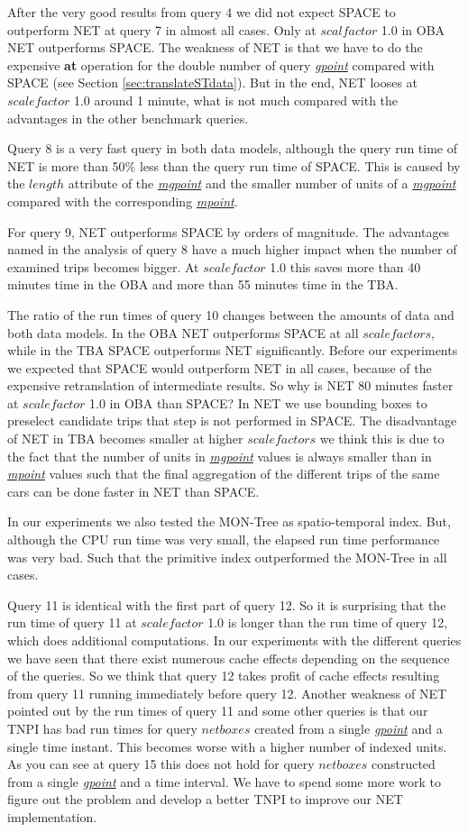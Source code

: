 \documentclass[a4paper]{article}
\newcommand{\op}[1]{\textbf{#1}}
\newcommand{\dt}[1]{\textsl{\underline{#1}}}
\begin{document}
After the very good results from query 4 we did not expect SPACE to outperform
NET at query 7 in almost all cases. Only at $scalfactor$ 1.0 in OBA NET outperforms
SPACE. The weakness of NET is that we have to do the expensive \op{at} operation
for the double number of query \dt{gpoint} compared with SPACE
(see Section \ref{sec:translateSTdata}).
But in the end, NET looses at $scalefactor$ 1.0 around 1 minute, what is not much
compared with the advantages in the other benchmark queries.

Query 8 is a very fast query in both data models, although the query run time of
NET is more than 50\% less than the query run time of SPACE. This is caused by the
$length$ attribute of the \dt{mgpoint} and the smaller number of units of a
\dt{mgpoint} compared with the corresponding \dt{mpoint}.

For query 9, NET outperforms SPACE by orders of magnitude. The advantages
named in the analysis of query 8 have a much higher impact
when the number of examined trips becomes bigger. At $scalefactor$ 1.0 this saves
more than 40 minutes time in the OBA and more than 55 minutes time in the TBA.

The ratio of the run times of query 10 changes between the amounts of data and
both data models. In the OBA NET outperforms SPACE at all $scalefactors$,
while in the TBA SPACE outperforms NET significantly.
Before our experiments we expected that SPACE would outperform NET in all cases,
because of the expensive retranslation of intermediate results.
So why is NET 80 minutes faster at $scalefactor$ 1.0 in OBA than SPACE?
In NET we use bounding boxes to preselect candidate trips that step is not
performed in SPACE. The disadvantage of NET in TBA becomes smaller at higher
$scalefactors$ we think this is due to the fact that the number of units in
\dt{mgpoint} values is always smaller than in \dt{mpoint} values such that the
final aggregation of the different trips of the same cars can be done faster
in NET than SPACE.

In our experiments we also tested the MON-Tree \cite{MONTreeAlmeidaGeoinformatica}
as spatio-temporal index. But, although the CPU run time was very small, the
elapsed run time performance was very bad. Such that the primitive index outperformed
the MON-Tree in all cases.

Query 11 is identical with the first part of query 12. So it is surprising that
the run time of query 11 at $scalefactor$ 1.0 is longer than the run time of query 12,
which does additional computations. In our experiments with the different queries
we have seen that there exist numerous cache effects depending on the sequence of
the queries. So we think that query 12 takes profit of cache effects resulting from
query 11 running immediately before query 12. Another weakness of NET pointed
out by the run times of query 11 and some other queries is that our TNPI has bad
run times for query $netboxes$ created from a single \dt{gpoint} and a single
time instant. This becomes worse with a higher number of indexed units. As you can
see at query 15 this does not hold for query $netboxes$ constructed from a single
\dt{gpoint} and a time interval. We have to spend some more work to figure out
the problem and develop a better TNPI to improve our NET implementation.
\end{document}
